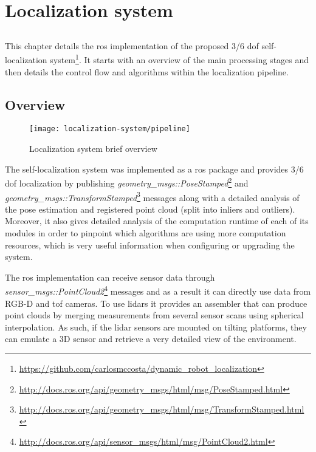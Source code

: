 \chapter{Localization system} \label{chap:localization-system}



\section*{}

This chapter details the \gls{ros} implementation of the proposed 3/6 \gls{dof} self-localization system\footnote{\url{https://github.com/carlosmccosta/dynamic_robot_localization}}. It starts with an overview of the main processing stages and then details the control flow and algorithms within the localization pipeline.



\section{Overview}

\begin{wrapfigure}{r}{0.4\textwidth}
	\centering
	\texttt{[image: localization-system/pipeline]}
	\caption{Localization system brief overview}
	\label{fig:localization-system_localization-system-brief-overview}
\end{wrapfigure}

The self-localization system was implemented as a \gls{ros} package and provides 3/6 \gls{dof} localization by publishing \emph{geometry\_msgs::PoseStamped}\footnote{\url{http://docs.ros.org/api/geometry_msgs/html/msg/PoseStamped.html}} and \emph{geometry\_msgs::TransformStamped}\footnote{\url{http://docs.ros.org/api/geometry_msgs/html/msg/TransformStamped.html}} messages along with a detailed analysis of the pose estimation and registered point cloud (split into inliers and outliers). Moreover, it also gives detailed analysis of the computation runtime of each of its modules in order to pinpoint which algorithms are using more computation resources, which is very useful information when configuring or upgrading the system.

The \gls{ros} implementation can receive sensor data through \emph{sensor\_msgs::PointCloud2}\footnote{\url{http://docs.ros.org/api/sensor_msgs/html/msg/PointCloud2.html}} messages and as a result it can directly use data from RGB-D and \gls{tof} cameras. To use \glspl{lidar} it provides an assembler that can produce point clouds by merging measurements from several sensor scans using spherical interpolation. As such, if the \gls{lidar} sensors are mounted on tilting platforms, they can emulate a 3D sensor and retrieve a very detailed view of the environment.

